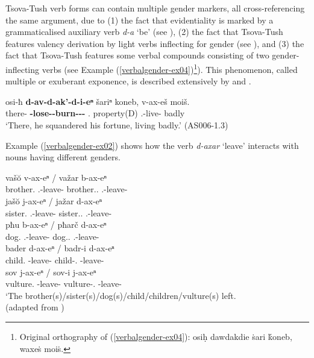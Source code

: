 Tsova-Tush verb forms can contain multiple gender markers, all cross\hyp referencing the same argument, due to (1) the fact that evidentiality is marked by a grammaticalised auxiliary verb \textit{d-a} `be' (see ), (2) the fact that Tsova-Tush features valency derivation by light verbs inflecting for gender (see ), and (3) the fact that Tsova-Tush features some verbal compounds consisting of two gender-inflecting verbs (see Example (\ref{verbalgender-ex04})\footnote{Original orthography of (\ref{verbalgender-ex04}): osiḥ dawdakdie \.{s}ari \'{k}oneb, waxe\.{s} moi\.{s}.}). This phenomenon, called multiple or exuberant exponence, is described extensively by \textcite{harris08,harris09} and \textcite{harrissamuel}.



	\begin{exe}
		\ex\label{verbalgender-ex04}
		\gll osi-ħ \textbf{d-av-d-ak'-d-i-eⁿ} šariⁿ koneb, v-ax-eš moiš. \\
		there-{\Ess} \textbf{{\D}-lose-{\D}-burn-{\D}-{\Tr}-{\Aor}} {\Refl}.{\Poss} property(D) {\M}.{\Sg}-live-{\Simul} badly \\
		\trans `There, he squandered his fortune, living badly.'
		\hfill (AS006-1.3)
	\end{exe}




Example (\ref{verbalgender-ex02}) shows how the verb \textit{d-axar} `leave' interacts with nouns having different genders.

\begin{exe}
	\ex\label{verbalgender-ex02}
	\begin{xlist}
		
		\ex
		\gll vaš\u{o} v-ax-eⁿ / važar b-ax-eⁿ \\
		brother.{\Nom} {\M}.{\Sg}-leave-{\Aor} {} brother.{\Nom}.{\Pl} {\M}.{\Pl}-leave-{\Aor} \\
		
		\ex
		\gll jaš\u{o} j-ax-eⁿ / jažar d-ax-eⁿ \\
		sister.{\Nom} {\F}.{\Sg}-leave-{\Aor} {} sister.{\Nom}.{\Pl} {\F}.{\Pl}-leave-{\Aor} \\
		
		\ex
		\gll pħu b-ax-eⁿ / pħarč d-ax-eⁿ \\
		dog.{\Nom} {\B}.{\Sg}-leave-{\Aor} {} dog.{\Pl}.{\Nom} {\B}.{\Pl}-leave-{\Aor} \\
		
		\ex 
		\gll bader d-ax-eⁿ / badr-i d-ax-eⁿ \\
		child.{\Nom} {\D}-leave-{\Aor} {} child-{\Pl}.{\Nom} {\D}-leave-{\Aor} \\
		
		\ex
		\gll sov j-ax-eⁿ / sov-i j-ax-eⁿ \\
		vulture.{\Nom} {\J}-leave-{\Aor} {} vulture-{\Pl}.{\Nom} {\J}-leave-{\Aor} \\
		\trans `The brother(s)/sister(s)/dog(s)/child/children/vulture(s) left. \\
		\hfill (adapted from \textcite[177]{holiskygagua})
	\end{xlist}
\end{exe}

